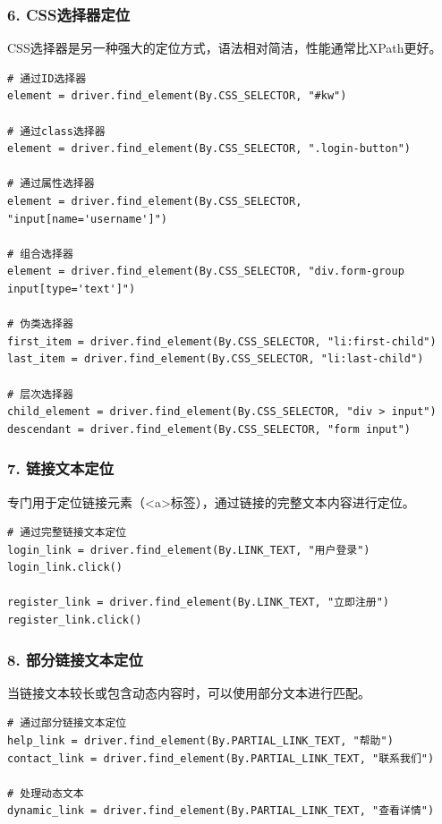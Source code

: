 \subsubsection{6. CSS选择器定位}
CSS选择器是另一种强大的定位方式，语法相对简洁，性能通常比XPath更好。

\begin{lstlisting}[style=demostyle,numbers=none]
# 通过ID选择器
element = driver.find_element(By.CSS_SELECTOR, "#kw")

# 通过class选择器
element = driver.find_element(By.CSS_SELECTOR, ".login-button")

# 通过属性选择器
element = driver.find_element(By.CSS_SELECTOR, "input[name='username']")

# 组合选择器
element = driver.find_element(By.CSS_SELECTOR, "div.form-group input[type='text']")

# 伪类选择器
first_item = driver.find_element(By.CSS_SELECTOR, "li:first-child")
last_item = driver.find_element(By.CSS_SELECTOR, "li:last-child")

# 层次选择器
child_element = driver.find_element(By.CSS_SELECTOR, "div > input")
descendant = driver.find_element(By.CSS_SELECTOR, "form input")
\end{lstlisting}

\subsubsection{7. 链接文本定位}
专门用于定位链接元素（<a>标签），通过链接的完整文本内容进行定位。

\begin{lstlisting}[style=demostyle,numbers=none]
# 通过完整链接文本定位
login_link = driver.find_element(By.LINK_TEXT, "用户登录")
login_link.click()

register_link = driver.find_element(By.LINK_TEXT, "立即注册")
register_link.click()
\end{lstlisting}

\subsubsection{8. 部分链接文本定位}
当链接文本较长或包含动态内容时，可以使用部分文本进行匹配。

\begin{lstlisting}[style=demostyle,numbers=none]
# 通过部分链接文本定位
help_link = driver.find_element(By.PARTIAL_LINK_TEXT, "帮助")
contact_link = driver.find_element(By.PARTIAL_LINK_TEXT, "联系我们")

# 处理动态文本
dynamic_link = driver.find_element(By.PARTIAL_LINK_TEXT, "查看详情")
\end{lstlisting}

